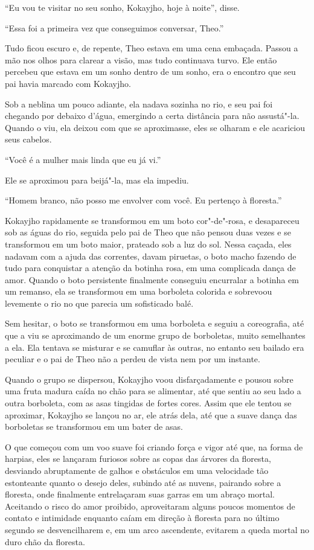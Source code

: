 ``Eu vou te visitar no seu sonho, Kokayjho, hoje à noite'', disse.

``Essa foi a primeira vez que conseguimos conversar, Theo.''

Tudo ficou escuro e, de repente, Theo estava em uma cena embaçada.
Passou a mão nos olhos para clarear a visão, mas tudo continuava turvo.
Ele então percebeu que estava em um sonho dentro de um sonho, era o
encontro que seu pai havia marcado com Kokayjho.

Sob a neblina um pouco adiante, ela nadava sozinha no rio, e seu pai foi
chegando por debaixo d'água, emergindo a certa distância para não
assustá"-la. Quando o viu, ela deixou com que se aproximasse, eles se
olharam e ele acariciou seus cabelos.

``Você é a mulher mais linda que eu já vi.''

Ele se aproximou para beijá"-la, mas ela impediu.

``Homem branco, não posso me envolver com você. Eu pertenço à
floresta.''

Kokayjho rapidamente se transformou em um boto cor"-de"-rosa, e desapareceu
sob as águas do rio, seguida pelo pai de Theo que não pensou duas vezes
e se transformou em um boto maior, prateado sob a luz do sol. Nessa
caçada, eles nadavam com a ajuda das correntes, davam piruetas, o boto
macho fazendo de tudo para conquistar a atenção da botinha rosa, em uma
complicada dança de amor. Quando o boto persistente finalmente conseguiu
encurralar a botinha em um remanso, ela se transformou em uma borboleta
colorida e sobrevoou levemente o rio no que parecia um sofisticado
balé.

Sem hesitar, o boto se transformou em uma borboleta e seguiu a
coreografia, até que a viu se aproximando de um enorme grupo de
borboletas, muito semelhantes a ela. Ela tentava se misturar e se
camuflar às outras, no entanto seu bailado era peculiar e o pai de Theo
não a perdeu de vista nem por um instante.

Quando o grupo se dispersou, Kokayjho voou disfarçadamente e pousou
sobre uma fruta madura caída no chão para se alimentar, até que sentiu
ao seu lado a outra borboleta, com as asas tingidas de fortes cores.
Assim que ele tentou se aproximar, Kokayjho se lançou no ar, ele atrás
dela, até que a suave dança das borboletas se transformou em um bater de
asas.

O que começou com um voo suave foi criando força e vigor até que, na
forma de harpias, eles se lançaram furiosos sobre as copas das árvores
da floresta, desviando abruptamente de galhos e obstáculos em uma
velocidade tão estonteante quanto o desejo deles, subindo até as nuvens,
pairando sobre a floresta, onde finalmente entrelaçaram suas garras em
um abraço mortal. Aceitando o risco do amor proibido, aproveitaram
alguns poucos momentos de contato e intimidade enquanto caíam em direção
à floresta para no último segundo se desvencilharem e, em um arco
ascendente, evitarem a queda mortal no duro chão da floresta.

